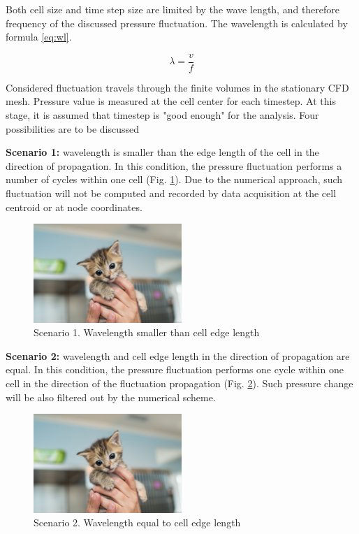 Both cell size and time step size are limited by the wave length, and therefore frequency of the discussed pressure fluctuation. The wavelength is calculated by formula \ref{eq:wl}.

\begin{equation} \label{eq:wl}
\lambda = \frac{v}{f}
\end{equation}

Considered fluctuation travels through the finite volumes in the stationary CFD mesh. Pressure value is measured at the cell center for each timestep. At this stage, it is assumed that timestep is "good enough" for the analysis. Four possibilities are to be discussed 

\textbf{Scenario 1:} wavelength is smaller than the edge length of the cell in the direction of propagation. In this condition, the pressure fluctuation performs a number of cycles within one cell (Fig. \ref{scen1}). Due to the numerical approach, such fluctuation will not be computed and recorded by data acquisition at the cell centroid or at node coordinates.

\begin{figure}[h!]
\centering %
\includegraphics[width=0.5\textwidth]{Pictures/kitten-placeholder.jpg}
\caption{Scenario 1. Wavelength smaller than cell edge length}
\label{scen1}
\end{figure}

\textbf{Scenario 2:} wavelength and cell edge length in the direction of propagation are equal. In this condition, the pressure fluctuation performs one cycle within one cell in the direction of the fluctuation propagation (Fig. \ref{scen2}). Such pressure change will be also filtered out by the numerical scheme.

\begin{figure}[h!]
\centering %
\includegraphics[width=0.5\textwidth]{Pictures/kitten-placeholder.jpg}
\caption{Scenario 2. Wavelength equal to cell edge length}
\label{scen2}
\end{figure}

